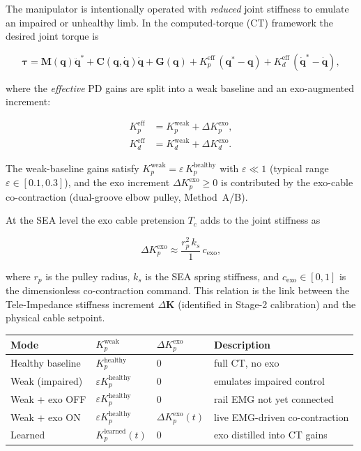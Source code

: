 \documentclass[11pt, a4paper]{article}
\newcommand{\bq}{\bm{q}}
\newcommand{\btau}{\bm{\tau}}
\newcommand{\bM}{\bm{M}}
\newcommand{\bC}{\bm{C}}
\newcommand{\bG}{\bm{G}}
\begin{document}
The manipulator is intentionally operated with \emph{reduced} joint
stiffness to emulate an impaired or unhealthy limb.  In the computed-torque
(CT) framework the desired joint torque is

\begin{equation}
  \btau = \bM(\bq)\ddot{\bq}^* + \bC(\bq,\dot{\bq})\dot{\bq}
        + \bG(\bq)
        + K_p^{\text{eff}}\,(\bq^*-\bq)
        + K_d^{\text{eff}}\,(\dot{\bq}^*-\dot{\bq}),
\end{equation}

where the \emph{effective} PD gains are split into a weak baseline and an
exo-augmented increment:

\begin{align}
  K_p^{\text{eff}} &= K_p^{\text{weak}} + \Delta K_p^{\text{exo}}, \\
  K_d^{\text{eff}} &= K_d^{\text{weak}} + \Delta K_d^{\text{exo}}.
\end{align}

The weak-baseline gains satisfy $K_p^{\text{weak}} = \varepsilon\,
K_p^{\text{healthy}}$ with $\varepsilon \ll 1$ (typical range
$\varepsilon \in [0.1, 0.3]$), and the exo increment
$\Delta K_p^{\text{exo}} \geq 0$ is contributed by the exo-cable
co-contraction (dual-groove elbow pulley, Method~A/B).

At the SEA level the exo cable pretension $T_c$ adds to the joint
stiffness as

\begin{equation}
  \Delta K_p^{\text{exo}} \approx \frac{r_p^2\,k_s}{1}\,c_{\text{exo}},
\end{equation}

where $r_p$ is the pulley radius, $k_s$ is the SEA spring stiffness, and
$c_{\text{exo}} \in [0,1]$ is the dimensionless co-contraction command.
This relation is the link between the Tele-Impedance stiffness increment
$\Delta\mathbf{K}$ (identified in Stage-2 calibration) and the physical
cable setpoint.

\begin{center}
{\small
\begin{tabular}{llll}
\toprule
\textbf{Mode} & $K_p^{\text{weak}}$ & $\Delta K_p^{\text{exo}}$ & \textbf{Description} \\
\midrule
Healthy baseline & $K_p^{\text{healthy}}$ & 0 & full CT, no exo \\
Weak (impaired)  & $\varepsilon K_p^{\text{healthy}}$ & 0 & emulates impaired control \\
Weak + exo OFF   & $\varepsilon K_p^{\text{healthy}}$ & 0 & rail EMG not yet connected \\
Weak + exo ON    & $\varepsilon K_p^{\text{healthy}}$ & $\Delta K_p^{\text{exo}}(t)$ & live EMG-driven co-contraction \\
Learned          & $K_p^{\text{learned}}(t)$ & 0 & exo distilled into CT gains \\
\bottomrule
\end{tabular}}
\end{center}
\end{document}
